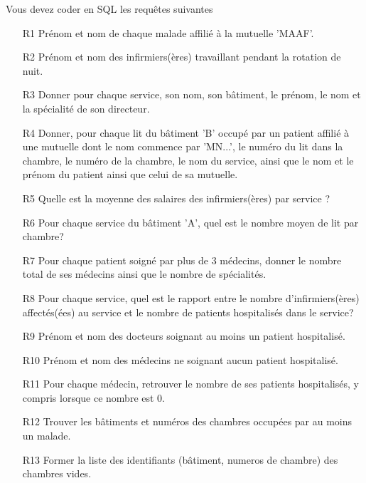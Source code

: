 Vous devez coder en SQL les requêtes suivantes 
\begin{enumerate}
  \item[R1] Prénom et nom de chaque malade affilié à la mutuelle 'MAAF'.
  \item[R2] Prénom et nom des infirmiers(ères) travaillant pendant la rotation de nuit.
  \item[R3] Donner pour chaque service, son nom, son bâtiment, le prénom, le nom et la spécialité de son directeur.
  
  \item[R4] Donner, pour chaque lit du bâtiment 'B' occupé par un patient affilié à une mutuelle dont le nom commence par 'MN...', le numéro du lit dans la chambre, le numéro de la chambre, le nom du service, ainsi que le nom et le prénom du patient ainsi que celui de sa mutuelle.
  
  \item[R5] Quelle est la moyenne des salaires des infirmiers(ères) par service ?
  
  \item[R6] Pour chaque service du bâtiment 'A', quel est le nombre moyen de lit par chambre?
  
  \item[R7] Pour chaque patient soigné par plus de 3 médecins, donner le nombre total de ses médecins ainsi que le nombre de spécialités.
  
  \item[R8] Pour chaque service, quel est le rapport entre le nombre d'infirmiers(ères) affectés(ées) au service et le nombre de patients hospitalisés dans le service?
  
  \item[R9] Prénom et nom des docteurs soignant au moins un patient hospitalisé.
  
  \item[R10] Prénom et nom des médecins ne soignant aucun patient hospitalisé.
  
  \item[R11] Pour chaque médecin, retrouver le nombre de ses patients hospitalisés, y compris lorsque ce nombre est 0.
  
  \item[R12] Trouver les bâtiments et numéros des chambres occupées par au moins un malade.
  
  \item[R13] Former la liste des identifiants (bâtiment, numeros de chambre) des chambres vides.
  

\end{enumerate}
